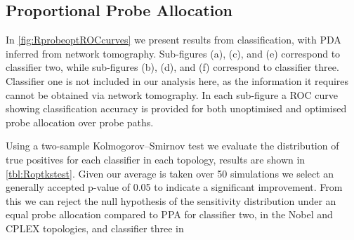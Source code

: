 \subsection{Proportional Probe Allocation}
\label{ssec:Rprobeallocation}
In \cref{fig:RprobeoptROCcurves} we present results from classification, with PDA inferred from network tomography. Sub-figures (a), (c), and (e) correspond to classifier two, while sub-figures (b), (d), and (f) correspond to classifier three. Classifier one is not included in our analysis here, as the information it requires cannot be obtained via network tomography. In each sub-figure a ROC curve showing classification accuracy is provided for both unoptimised and optimised probe allocation over probe paths.\par
Using a two-sample Kolmogorov–Smirnov test we evaluate the distribution of true positives for each classifier in each topology, results are shown in \cref{tbl:Roptkstest}. Given our average is taken over 50 simulations we select an generally accepted p-value of 0.05 to indicate a significant improvement. From this we can reject the null hypothesis of the sensitivity distribution under an equal probe allocation compared to PPA for classifier two, in the Nobel and CPLEX topologies, and classifier three in 
